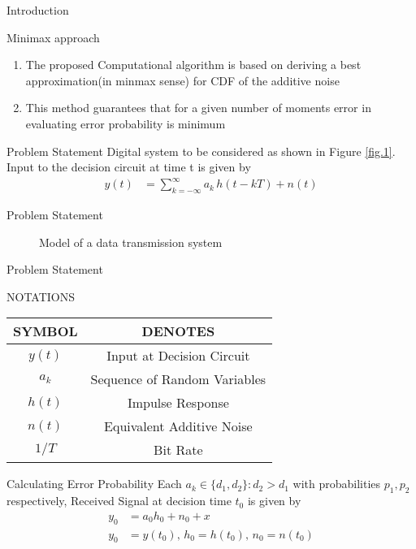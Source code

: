 \documentclass{beamer}
\begin{document}
\begin{frame}{Introduction}
\begin{block}{Minimax approach}
\begin{enumerate}[]
 \item The proposed Computational algorithm is based on deriving a best approximation(in minmax sense) for CDF of 
       the additive noise
\item This method guarantees that for a given number of moments error in evaluating error probability is minimum 
\end{enumerate}
\end{block}
\begin{block}{Problem Statement}
Digital system to be considered as shown in Figure \eqref{fig.1}. Input to the decision circuit at time 
t is given by 
\begin{align}
y(t) &= \sum_{k = -\infty}^{\infty} a_{k}\,h(t-kT) + n(t)
\end{align}

\end{block}
\end{frame}
\begin{frame}{Problem Statement}
\begin{figure}
    \caption{Model of a data transmission system}
    \label{fig.1}
\end{figure}
\end{frame}
\begin{frame}{Problem Statement}
\begin{block}{NOTATIONS}
    \begin{center}
    \begin{tabular}{ |c|c| } 
    \hline
    SYMBOL & DENOTES \\ 
    \hline
    $y(t)$ & Input at Decision Circuit\\ \hline
    $a_{k}$ & Sequence of Random Variables\\ \hline
    $h(t)$ & Impulse Response\\ \hline
    $n(t)$ & Equivalent Additive Noise\\ \hline
    $1/T$ & Bit Rate\\ \hline
    \end{tabular}
    \end{center}
\end{block}
\begin{block}{Calculating Error Probability}
Each $a_{k} \in \{d_{1},d_{2}\} : d_{2}>d_{1}$  with probabilities $p_{1},p_{2}$ respectively,  
Received Signal at decision time $t_{0}$ is given by
\begin{align}
y_{0} &= a_{0}h_{0} + n_{0} + x \label{eqn_2}  \\
y_{0} &= y(t_{0}),\,h_{0} = h(t_{0}),\,n_{0} = n(t_{0})
\end{align}
\end{block}
\end{frame}
\end{document}
